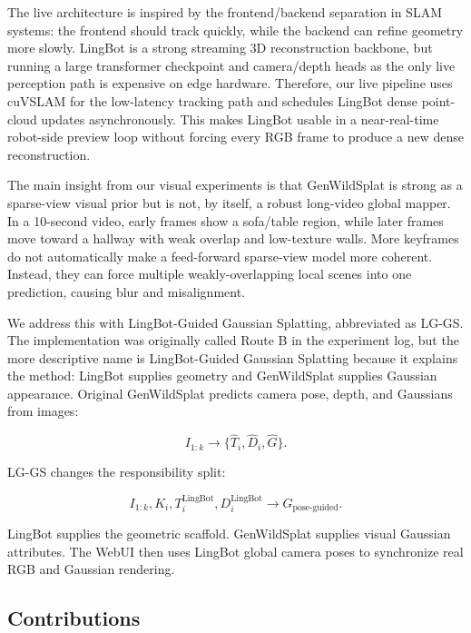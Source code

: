 \documentclass[11pt]{article}
\newcommand{\methodname}{LingBot-Guided Gaussian Splatting\xspace}
\newcommand{\methodabbr}{LG-GS}
\newcommand{\RouteB}{\methodabbr\xspace}
\begin{document}
The live architecture is inspired by the frontend/backend separation in SLAM systems: the frontend should track quickly, while the backend can refine geometry more slowly. LingBot is a strong streaming 3D reconstruction backbone, but running a large transformer checkpoint and camera/depth heads as the only live perception path is expensive on edge hardware. Therefore, our live pipeline uses cuVSLAM for the low-latency tracking path and schedules LingBot dense point-cloud updates asynchronously. This makes LingBot usable in a near-real-time robot-side preview loop without forcing every RGB frame to produce a new dense reconstruction.

The main insight from our visual experiments is that GenWildSplat is strong as a sparse-view visual prior but is not, by itself, a robust long-video global mapper. In a 10-second video, early frames show a sofa/table region, while later frames move toward a hallway with weak overlap and low-texture walls. More keyframes do not automatically make a feed-forward sparse-view model more coherent. Instead, they can force multiple weakly-overlapping local scenes into one prediction, causing blur and misalignment.

We address this with \methodname, abbreviated as \RouteB. The implementation was originally called Route B in the experiment log, but the more descriptive name is \methodname because it explains the method: LingBot supplies geometry and GenWildSplat supplies Gaussian appearance. Original GenWildSplat predicts camera pose, depth, and Gaussians from images:

\begin{equation}
I_{1:k} \rightarrow \{\hat{T}_i, \hat{D}_i, \hat{G}\}.
\end{equation}

\RouteB changes the responsibility split:

\begin{equation}
I_{1:k}, K_i, T_i^{\mathrm{LingBot}}, D_i^{\mathrm{LingBot}}
\rightarrow G_{\mathrm{pose\mbox{-}guided}}.
\end{equation}

LingBot supplies the geometric scaffold. GenWildSplat supplies visual Gaussian attributes. The WebUI then uses LingBot global camera poses to synchronize real RGB and Gaussian rendering.

\subsection{Contributions}
\end{document}
